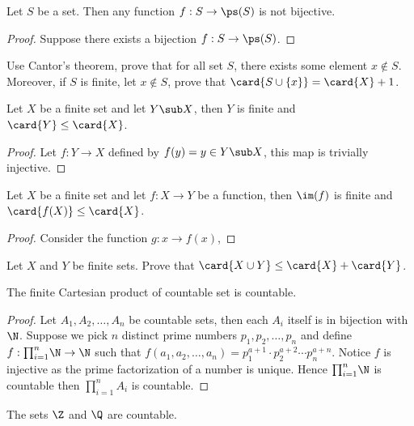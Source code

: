 \documentclass[10pt]{article}
\begin{document}
\begin{theorem}
    Let $S$ be a set. Then any function $f:S\to\ps(S)$ is not bijective.
\end{theorem}
\begin{proof}
    Suppose there exists a bijection $f:S\to\ps(S)$.
    

\end{proof}
\begin{problem}
    Use Cantor's theorem, prove that for all set $S$, there exists some element $x\notin S$. Moreover, if $S$ is finite, let $x\notin S$, prove that $\card{S\cup\{x\}}=\card{X}+1$.
\end{problem}
\begin{proposition}
    Let $X$ be a finite set and let $Y\sub X$, then $Y$ is finite and $\card{Y}\le\card{X}$.
\end{proposition}
\begin{proof}
    Let $f:Y\to X$ defined by $f(y)=y\in Y\sub X$, this map is trivially injective.
\end{proof}
\begin{proposition}
    Let $X$ be a finite set and let $f:X\to Y$ be a function, then $\im(f)$ is finite and $\card{f(X)}\le\card{X}$.
\end{proposition}
\begin{proof}
    Consider the function $g:x\to f(x)$, 
\end{proof}
\begin{problem}
    Let $X$ and $Y$ be finite sets. Prove that $\card{X\cup Y}\le\card{X}+\card{Y}$.
\end{problem}
\begin{proposition}
    The finite Cartesian product of countable set is countable.
\end{proposition}
\begin{proof}
    Let ${A}_{1},{A}_{2},\dots,{A}_{n}$ be countable sets, then each ${A}_{i}$ itself is in bijection with $\N$. Suppose we pick $n$ distinct prime numbers ${p}_{1},{p}_{2},\dots,{p}_{n}$ and define $f:{\prod}_{i=1}^{n}\N\to\N$ such that $f({a}_{1},{a}_{2},\dots,{a}_{n})={p}_{1}^{a+1}\cdot{p}_{2}^{a+2}\cdots{p}_{n}^{a+n}$. Notice $f$ is injective as the prime factorization of a number is unique. Hence ${\prod}_{i=1}^{n}\N$ is countable then ${\prod}_{i=1}^{n}{A}_{i}$ is countable.
\end{proof}
\begin{proposition} 
    The sets $\Z$ and $\Q$ are countable.
\end{proposition}
\end{document}
